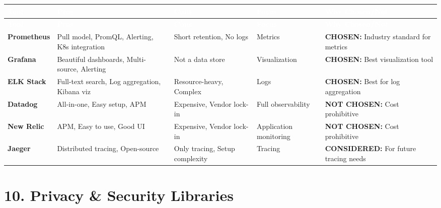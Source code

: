 \documentclass[12pt,a4paper,landscape]{article}
\begin{document}
\begin{longtable}{|p{2.5cm}|p{3cm}|p{3cm}|p{3cm}|p{4cm}|}
\hline
\rowcolor{headercolor}
\textcolor{white}{\textbf{Tool}} & 
\textcolor{white}{\textbf{Pros}} & 
\textcolor{white}{\textbf{Cons}} & 
\textcolor{white}{\textbf{Focus}} & 
\textcolor{white}{\textbf{Why Chosen/Not}} \\
\hline
\endfirsthead

\hline
\rowcolor{headercolor}
\textcolor{white}{\textbf{Tool}} & 
\textcolor{white}{\textbf{Pros}} & 
\textcolor{white}{\textbf{Cons}} & 
\textcolor{white}{\textbf{Focus}} & 
\textcolor{white}{\textbf{Why Chosen/Not}} \\
\hline
\endhead

\rowcolor{rowcolor1}
\textbf{Prometheus} & 
Pull model, PromQL, Alerting, K8s integration & 
Short retention, No logs & 
Metrics & 
\textbf{CHOSEN:} Industry standard for metrics \\
\hline

\rowcolor{rowcolor2}
\textbf{Grafana} & 
Beautiful dashboards, Multi-source, Alerting & 
Not a data store & 
Visualization & 
\textbf{CHOSEN:} Best visualization tool \\
\hline

\rowcolor{rowcolor1}
\textbf{ELK Stack} & 
Full-text search, Log aggregation, Kibana viz & 
Resource-heavy, Complex & 
Logs & 
\textbf{CHOSEN:} Best for log aggregation \\
\hline

\rowcolor{rowcolor2}
\textbf{Datadog} & 
All-in-one, Easy setup, APM & 
Expensive, Vendor lock-in & 
Full observability & 
\textbf{NOT CHOSEN:} Cost prohibitive \\
\hline

\rowcolor{rowcolor1}
\textbf{New Relic} & 
APM, Easy to use, Good UI & 
Expensive, Vendor lock-in & 
Application monitoring & 
\textbf{NOT CHOSEN:} Cost prohibitive \\
\hline

\rowcolor{rowcolor2}
\textbf{Jaeger} & 
Distributed tracing, Open-source & 
Only tracing, Setup complexity & 
Tracing & 
\textbf{CONSIDERED:} For future tracing needs \\
\hline
\end{longtable}

\newpage

\section*{10. Privacy \& Security Libraries}
\end{document}
